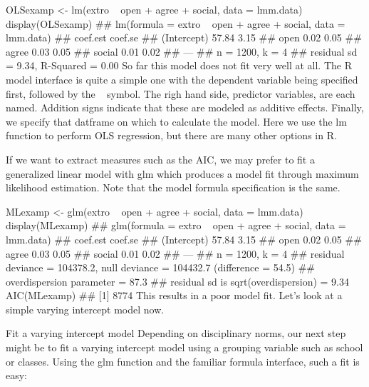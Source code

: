 OLSexamp <- lm(extro ~ open + agree + social, data = lmm.data)
display(OLSexamp)
## lm(formula = extro ~ open + agree + social, data = lmm.data)
##             coef.est coef.se
## (Intercept) 57.84     3.15  
## open         0.02     0.05  
## agree        0.03     0.05  
## social       0.01     0.02  
## ---
## n = 1200, k = 4
## residual sd = 9.34, R-Squared = 0.00
So far this model does not fit very well at all. The R model interface is quite a simple one with the dependent variable being specified first, followed by the ~ symbol. The righ hand side, predictor variables, are each named. Addition signs indicate that these are modeled as additive effects. Finally, we specify that datframe on which to calculate the model. Here we use the lm function to perform OLS regression, but there are many other options in R.

If we want to extract measures such as the AIC, we may prefer to fit a generalized linear model with glm which produces a model fit through maximum likelihood estimation. Note that the model formula specification is the same.

MLexamp <- glm(extro ~ open + agree + social, data = lmm.data)
display(MLexamp)
## glm(formula = extro ~ open + agree + social, data = lmm.data)
##             coef.est coef.se
## (Intercept) 57.84     3.15  
## open         0.02     0.05  
## agree        0.03     0.05  
## social       0.01     0.02  
## ---
##   n = 1200, k = 4
##   residual deviance = 104378.2, null deviance = 104432.7 (difference = 54.5)
##   overdispersion parameter = 87.3
##   residual sd is sqrt(overdispersion) = 9.34
AIC(MLexamp)
## [1] 8774
This results in a poor model fit. Let's look at a simple varying intercept model now.

Fit a varying intercept model
Depending on disciplinary norms, our next step might be to fit a varying intercept model using a grouping variable such as school or classes. Using the glm function and the familiar formula interface, such a fit is easy:

